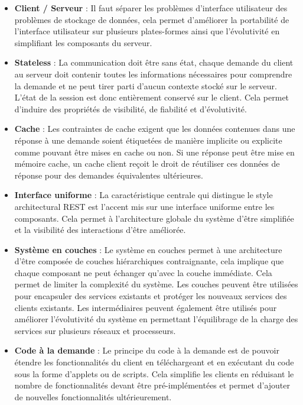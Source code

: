 \begin{itemize}

    \item \textbf{Client / Serveur} : 
    \newline
    Il faut séparer les problèmes d’interface utilisateur des problèmes de stockage de données, cela permet d'améliorer la portabilité de l'interface utilisateur sur plusieurs plates-formes ainsi que l’évolutivité en simplifiant les composants du serveur.
    
    \item \textbf{Stateless} :
    \newline
    La communication doit être sans état, chaque demande du client au serveur doit contenir toutes les informations nécessaires pour comprendre la demande et ne peut tirer parti d'aucun contexte stocké sur le serveur. L'état de la session est donc entièrement conservé sur le client. Cela permet d'induire des propriétés de visibilité, de fiabilité et d'évolutivité.
    
    \item \textbf{Cache} :
    \newline
    Les contraintes de cache exigent que les données contenues dans une réponse à une demande soient étiquetées de manière implicite ou explicite comme pouvant être mises en cache ou non. Si une réponse peut être mise en mémoire cache, un cache client reçoit le droit de réutiliser ces données de réponse pour des demandes équivalentes ultérieures.
    
    \item \textbf{Interface uniforme} :
    \newline
    La caractéristique centrale qui distingue le style architectural REST est l'accent mis sur une interface uniforme entre les composants. Cela permet à l'architecture globale du système d'être simplifiée et la visibilité des interactions d'être améliorée.
    
    \item \textbf{Système en couches} :
    \newline
    Le système en couches permet à une architecture d'être composée de couches hiérarchiques contraignante, cela implique que chaque composant ne peut échanger qu'avec la couche immédiate. Cela permet de limiter la complexité du système. Les couches peuvent être utilisées pour encapsuler des services existants et protéger les nouveaux services des clients existants. Les intermédiaires peuvent également être utilisés pour améliorer l'évolutivité du système en permettant l'équilibrage de la charge des services sur plusieurs réseaux et processeurs.
    
    \item \textbf{Code à la demande} :
    \newline
    Le principe du code à la demande est de pouvoir étendre les fonctionnalités du client en téléchargeant et en exécutant du code sous la forme d'applets ou de scripts. Cela simplifie les clients en réduisant le nombre de fonctionnalités devant être pré-implémentées et permet d'ajouter de nouvelles fonctionnalités ultérieurement.
    
\end{itemize}


